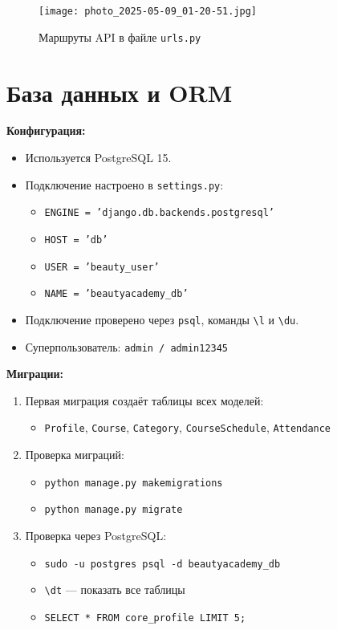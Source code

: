 \documentclass[a4paper,12pt]{article}
\begin{document}
\begin{itemize}[leftmargin=1.2cm]
\noindent \textbf{}
\begin{figure}[H]
    \centering
    \texttt{[image: photo\_2025-05-09\_01-20-51.jpg]}
    \caption{Маршруты API в файле \texttt{urls.py}}
    \label{fig:nginx-config}
\end{figure}

\section{База данных и ORM}

\textbf{Конфигурация:}

\begin{itemize}
    \item Используется PostgreSQL 15.
    \item Подключение настроено в \texttt{settings.py}:
    \begin{itemize}
        \item \texttt{ENGINE = 'django.db.backends.postgresql'}
        \item \texttt{HOST = 'db'}
        \item \texttt{USER = 'beauty_user'}
        \item \texttt{NAME = 'beautyacademy_db'}
    \end{itemize}
    \item Подключение проверено через \texttt{psql}, команды \verb|\l| и \verb|\du|.
    \item Суперпользователь: \texttt{admin / admin12345}
\end{itemize}

\textbf{Миграции:}

\begin{enumerate}
    \item Первая миграция создаёт таблицы всех моделей:
    \begin{itemize}
        \item \texttt{Profile}, \texttt{Course}, \texttt{Category}, \texttt{CourseSchedule}, \texttt{Attendance}
    \end{itemize}

    \item Проверка миграций:
    \begin{itemize}
        \item \texttt{python manage.py makemigrations}
        \item \texttt{python manage.py migrate}
    \end{itemize}

    \item Проверка через PostgreSQL:
    \begin{itemize}
        \item \texttt{sudo -u postgres psql -d beautyacademy_db}
        \item \verb|\dt| — показать все таблицы
        \item \verb|SELECT * FROM core_profile LIMIT 5;|
    \end{itemize}
\end{enumerate}


\end{itemize}
\end{document}
